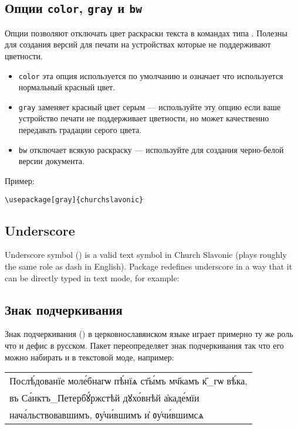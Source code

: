 \begin{RU}
\subsection{Опции \texttt{color}, \texttt{gray} и \texttt{bw}}
Опции позволяют отключать цвет раскраски текста в командах типа . Полезны для создания версий для печати на
устройствах которые не поддерживают цветности.

\begin{itemize}
\item \texttt{color} эта опция используется по умолчанию и означает что используется нормальный красный цвет.
\item \texttt{gray} заменяет красный цвет серым --- используйте эту опцию если ваше устройство печати не
    поддерживает цветности, но может качественно передавать градации серого цвета.
\item \texttt{bw} отключает всякую раскраску --- используйте для создания черно-белой версии документа.
\end{itemize}
Пример:
\end{RU}

\begin{verbatim}
\usepackage[gray]{churchslavonic}
\end{verbatim}

\begin{EN}
\subsection{Underscore}
Underscore symbol (\texttt{\textunderscore}) is a valid text symbol in Church Slavonic (plays roughly the same role as dash in English). Package
 redefines underscore in a way that it can be directly typed in text mode, for example:
\end{EN}
%
\begin{RU}
\subsection{Знак подчеркивания}
Знак подчеркивания (\texttt{\textunderscore}) в церковнославянском языке играет примерно ту же роль что и дефис в русском.
Пакет  переопределяет знак подчеркивания так что его можно набирать и в текстовой моде, например:
\end{RU}
%
\begin{center}
\begin{churchslavonic}
\begin{tabular}{l}
Послѣ́дованїе моле́бнагѡ пѣ́нїѧ ст҃ы́мъ мч҃камъ к҃_гѡ вѣ́ка, \\
въ Са́нктъ_Петербꙋ́ржстѣй дꙋхо́внѣй а҆каде́мїи \\
нача́льствовавшимъ, ᲂу҆чи́вшимъ и҆ ᲂу҆чи́вшимсѧ \\
\end{tabular}
\end{churchslavonic}
\end{center}

